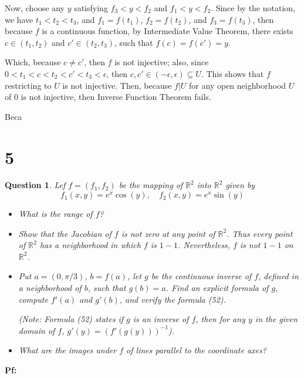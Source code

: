\documentclass{article}
\newtheorem{question}{Question}
\begin{document}
Now, choose any $y$ satisfying $f_3<y<f_2$ and $f_1<y<f_2$. Since by the notation, we have $t_1<t_2<t_3$, and $f_1=f(t_1)$, $f_2=f(t_2)$, and $f_3=f(t_3)$,
then because $f$ is a continuous function, by Intermediate Value Theorem, there exists $c\in (t_1,t_2)$ and $c'\in (t_2,t_3)$, such that $f(c)=f(c')=y$.

Which, because $c\neq c'$, then $f$ is not injective; also, since $0<t_1<c<t_2<c'<t_3<\epsilon$, then $c,c'\in (-\epsilon,\epsilon)\subseteq U$.
This shows that $f$ restricting to $U$ is not injective. Then, because $f|U$ for any open neighborhood $U$ of $0$ is not injective, then Inverse Function Theorem fails.

Beca

\break

\section*{5}
\begin{myBox}[]{}
    \begin{question}
        Lef $f=(f_1,f_2)$ be the mapping of $\mathbb{R}^2$ into $\mathbb{R}^2$ given by 
        $$f_1(x,y)=e^x\cos(y),\quad f_2(x,y)=e^x\sin(y)$$
        \begin{itemize}
            \item[(a)] What is the range of $f$?
            \item[(b)] Show that the Jacobian of $f$ is not zero at any point of $\mathbb{R}^2$. Thus every point of $\mathbb{R}^2$
            has a neighborhood in which $f$ is $1-1$. Nevertheless, $f$ is not $1-1$ on $\mathbb{R}^2$.
            \item[(c)] Put $a=(0,\pi/3)$, $b=f(a)$, let $g$ be the continuous inverse of $f$, defined in a neighborhood of $b$, such that $g(b)=a$.
            Find an explicit formula of $g$, compute $f'(a)$ and $g'(b)$, and verify the formula (52).

            (Note: Formula (52) states if $g$ is an inverse of $f$, then for any $y$ in the given domain of $f$, $g'(y)=(f'(g(y)))^{-1}$).
            \item[(d)] What are the images under $f$ of lines parallel to the coordinate axes?
        \end{itemize}
    \end{question}
\end{myBox}

\textbf{Pf:}
\end{document}
